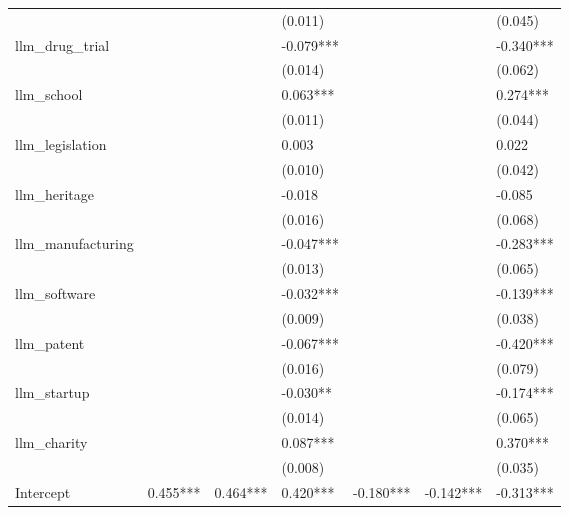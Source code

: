 \begin{table}
\begin{center}
\begin{tabular}{lllllll}
                   &           &           & (0.011)   &           &           & (0.045)    \\
llm\_drug\_trial   &           &           & -0.079*** &           &           & -0.340***  \\
                   &           &           & (0.014)   &           &           & (0.062)    \\
llm\_school        &           &           & 0.063***  &           &           & 0.274***   \\
                   &           &           & (0.011)   &           &           & (0.044)    \\
llm\_legislation   &           &           & 0.003     &           &           & 0.022      \\
                   &           &           & (0.010)   &           &           & (0.042)    \\
llm\_heritage      &           &           & -0.018    &           &           & -0.085     \\
                   &           &           & (0.016)   &           &           & (0.068)    \\
llm\_manufacturing &           &           & -0.047*** &           &           & -0.283***  \\
                   &           &           & (0.013)   &           &           & (0.065)    \\
llm\_software      &           &           & -0.032*** &           &           & -0.139***  \\
                   &           &           & (0.009)   &           &           & (0.038)    \\
llm\_patent        &           &           & -0.067*** &           &           & -0.420***  \\
                   &           &           & (0.016)   &           &           & (0.079)    \\
llm\_startup       &           &           & -0.030**  &           &           & -0.174***  \\
                   &           &           & (0.014)   &           &           & (0.065)    \\
llm\_charity       &           &           & 0.087***  &           &           & 0.370***   \\
                   &           &           & (0.008)   &           &           & (0.035)    \\
Intercept          & 0.455***  & 0.464***  & 0.420***  & -0.180*** & -0.142*** & -0.313***  \\

\end{tabular}
\end{center}
\end{table}
